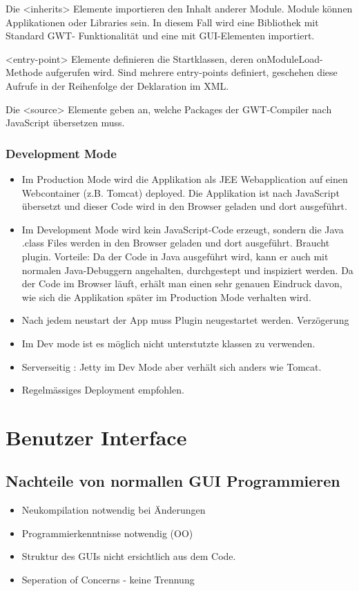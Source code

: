 \documentclass[a4paper,10pt]{scrreprt}
\begin{document}
Die <inherits> Elemente importieren den Inhalt anderer Module. Module können
Applikationen oder Libraries sein. In diesem Fall wird eine Bibliothek mit Standard GWT-
Funktionalität und eine mit GUI-Elementen importiert.

<entry-point> Elemente definieren die Startklassen, deren onModuleLoad-Methode
aufgerufen wird. Sind mehrere entry-points definiert, geschehen diese Aufrufe in der
Reihenfolge der Deklaration im XML.

Die <source> Elemente geben an, welche Packages der GWT-Compiler nach JavaScript
übersetzen muss.

\subsection{Development Mode}
\begin{itemize}
 \item Im Production Mode wird die Applikation als JEE Webapplication auf einen
Webcontainer (z.B. Tomcat) deployed. Die Applikation ist nach JavaScript übersetzt und dieser
Code wird in den Browser geladen und dort ausgeführt.
\item Im Development Mode wird kein JavaScript-Code erzeugt, sondern die Java .class Files werden in
den Browser geladen und dort ausgeführt. Braucht plugin. Vorteile:
\subitem Da der Code in Java ausgeführt wird, kann er auch mit normalen Java-Debuggern
angehalten, durchgestept und inspiziert werden.
\subitem Da der Code im Browser läuft, erhält man einen sehr genauen Eindruck davon, wie sich
die Applikation später im Production Mode verhalten wird. 
\item Nach jedem neustart der App muss Plugin neugestartet werden. Verzögerung
\item Im Dev mode ist es möglich nicht unterstutzte klassen zu verwenden.
\item Serverseitig : Jetty im Dev Mode aber verhält sich anders wie Tomcat.
\item Regelmässiges Deployment empfohlen.
\end{itemize}

\chapter{Benutzer Interface}

\section{Nachteile von normallen GUI Programmieren}
\begin{itemize}
 \item Neukompilation notwendig bei Änderungen
 \item Programmierkenntnisse notwendig (OO)
 \item Struktur des GUIs nicht ersichtlich aus dem Code.
 \item Seperation of Concerns - keine Trennung
\end{itemize}
\end{document}
